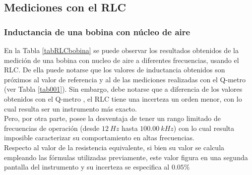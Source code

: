 \documentclass[a4paper,10pt]{article}
\begin{document}
		\subsection{Mediciones con el RLC}		
		\subsubsection{Inductancia de una bobina con n\'ucleo de aire}
		\indent En la Tabla \ref{tabRLCbobina} se puede observar los resultados 
		obtenidos de la medici\'on de una bobina con nucleo de aire a diferentes
		frecuencias, usando el RLC. De ella puede notarse que los valores de 
		inductancia obtenidos son pr\'oximos al valor de referencia y al de las 
		mediciones realizadas con el Q-metro (ver Tabla \ref{tab001}). Sin 
		embargo, debe notarse que a diferencia de los valores obtenidos con el 
		Q-metro , el RLC tiene una incerteza un orden menor, con lo cual resulta
		ser un instrumento m\'as exacto. \\
		\indent Pero, por otra parte, posee la desventaja de tener un rango 
		limitado de frecuencias de operaci\'on (desde $12~Hz$ hasta 
		$100.00~kHz$) con lo cual resulta imposible caracterizar su 
		comportamiento en altas frecuencias. \\
		\indent Respecto al valor de la resistencia equivalente, si bien su 
		valor se calcula empleando las f\'ormulas utilizadas previamente, este 
		valor figura en una segunda pantalla del instrumento y su incerteza se 
		especifica al $0.05\%$
\end{document}
